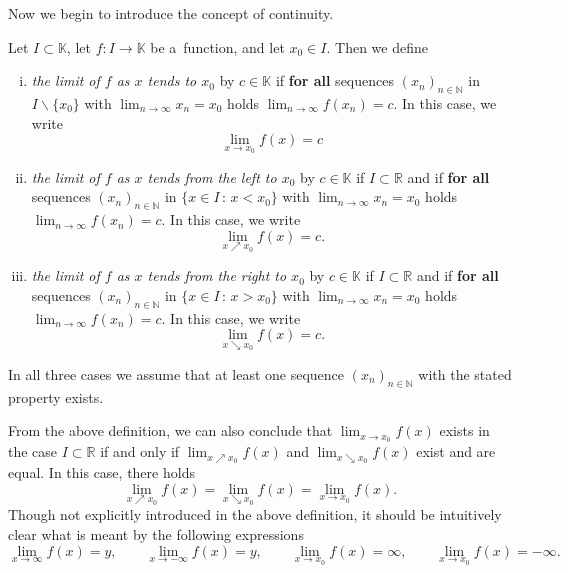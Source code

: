 

Now we begin to introduce the concept of continuity. 

\begin{Definition}
Let $I\subset\mathbb{K}$, let $f:I\to\mathbb{K}$ be a~function, and let $x_0\in I$. Then we define
\begin{enumerate}[(i)]
 \item \emph{the limit of $f$ as $x$ tends to $x_0$} by $c\in\mathbb{K}$
if \textbf{for all} sequences $(x_n)_{n\in\mathbb{N}}$ in $I\backslash\{x_0\}$ with $\lim_{n\to\infty}x_n=x_0$ holds
$\lim_{n\to\infty}f(x_n)=c$. In this case, we write
\[\lim_{x\to x_0}f(x)=c\]
 \item \emph{the limit of $f$ as $x$ tends from the left to $x_0$} by $c\in\mathbb{K}$
if $I\subset \mathbb{R}$ and if \textbf{for all} sequences $(x_n)_{n\in\mathbb{N}}$ in $\{x\in I\,:\,x< x_0\}$ with $\lim_{n\to\infty}x_n=x_0$ holds
$\lim_{n\to\infty}f(x_n)=c$. In this case, we write
\[\lim_{x\nearrow x_0}f(x)=c.\]
 \item \emph{the limit of $f$ as $x$ tends from the right to $x_0$} by $c\in\mathbb{K}$
if $I\subset \mathbb{R}$ and if \textbf{for all} sequences $(x_n)_{n\in\mathbb{N}}$ in $\{x\in I\,:\,x>x_0\}$ with $\lim_{n\to\infty}x_n=x_0$ holds
$\lim_{n\to\infty}f(x_n)=c$. In this case, we write
\[\lim_{x\searrow x_0}f(x)=c.\]
\end{enumerate}
In all three cases we assume that at least one sequence $(x_n)_{n\in\mathbb{N}}$ with the stated property exists.
\end{Definition}

\begin{Remark}{}
From the above definition, we can also conclude that $\lim_{x\to x_0}f(x)$ exists in the case $I\subset \mathbb{R}$ if and only if $\lim_{x\nearrow x_0}f(x)$ and $\lim_{x\searrow x_0}f(x)$ exist and are equal. In this case, there holds
\[\lim_{x\nearrow x_0}f(x)=\lim_{x\searrow x_0}f(x)=\lim_{x\to x_0}f(x).\]
Though not explicitly introduced in the above definition, it should be intuitively clear what is meant by the following expressions
\[\lim_{x\to\infty}f(x)=y,\qquad \lim_{x\to-\infty}f(x)=y,\qquad \lim_{x\to x_0}f(x)=\infty,\qquad \lim_{x\to x_0}f(x)=-\infty.\]
\end{Remark}

